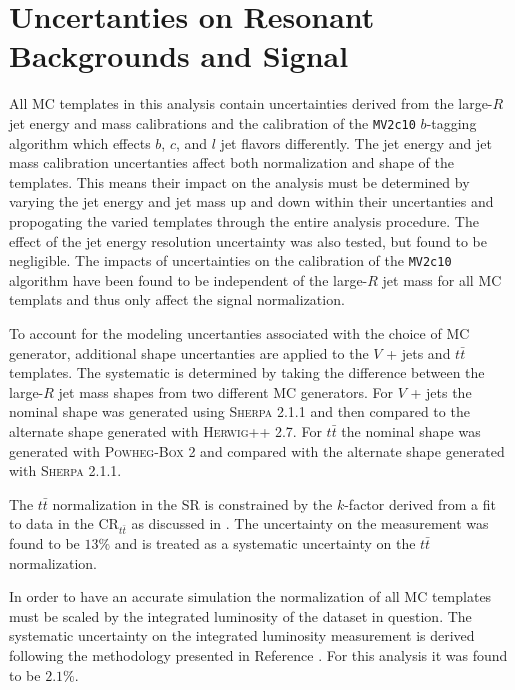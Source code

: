 \section{Uncertanties on Resonant Backgrounds and Signal} \label{sec:systematics:resonant_modeling}

All MC templates in this analysis contain uncertainties derived from the
large-$R$ jet energy and mass calibrations \cite{Aaboud:2018kfi} and the
calibration of the \texttt{MV2c10} $b$-tagging algorithm \cite{Aaboud:2018xwy}
which effects $b$, $c$, and $l$ jet flavors differently.  The jet energy and
jet mass calibration uncertanties affect both normalization and shape of the
templates.  This means their impact on the analysis must be determined by
varying the jet energy and jet mass up and down within their uncertanties and
propogating the varied templates through the entire analysis procedure.  The
effect of the jet energy resolution uncertainty was also tested, but found to
be negligible. The impacts of uncertainties on the calibration of the
\texttt{MV2c10} algorithm have been found to be independent of the large-$R$
jet mass for all MC templats and thus only affect the signal normalization.

To account for the modeling uncertanties associated with the choice of MC
generator, additional shape uncertanties are applied to the $V$ + jets and
$t\bar{t}$ templates.  The systematic is determined by taking the difference
between the large-$R$ jet mass shapes from two different MC generators.  For
$V$ + jets the nominal shape was generated using \textsc{Sherpa} 2.1.1 and then
compared to the alternate shape generated with \textsc{Herwig}++ 2.7.  For
$t\bar{t}$ the nominal shape was generated with \textsc{Powheg-Box} 2 and
compared with the alternate shape generated with \textsc{Sherpa} 2.1.1.

The $t\bar{t}$ normalization in the SR is constrained by the $k$-factor derived
from a fit to data in the $\text{CR}_{t\bar{t}}$ as discussed in
.  The uncertainty on the measurement was found to
be $13\%$ and is treated as a systematic uncertainty on the $t\bar{t}$
normalization.

In order to have an accurate simulation the normalization of all MC templates
must be scaled by the integrated luminosity of the dataset in question.  The
systematic uncertainty on the integrated luminosity measurement is derived
following the methodology presented in Reference \cite{Aad:2013ucp}.  For this
analysis it was found to be $2.1\%$.

